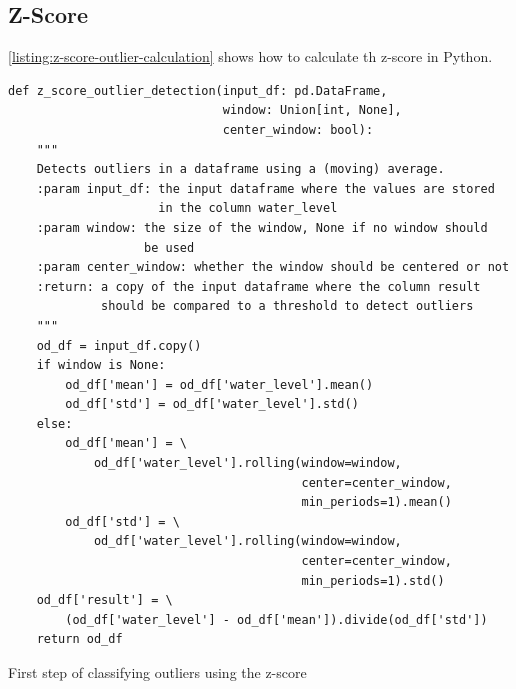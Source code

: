 \subsection{Z-Score}
\autoref{listing:z-score-outlier-calculation} shows how to calculate th z-score in Python.
\begin{listing}
\begin{verbatim}
def z_score_outlier_detection(input_df: pd.DataFrame,
                              window: Union[int, None],
                              center_window: bool):
    """
    Detects outliers in a dataframe using a (moving) average.
    :param input_df: the input dataframe where the values are stored
                     in the column water_level
    :param window: the size of the window, None if no window should
                   be used
    :param center_window: whether the window should be centered or not
    :return: a copy of the input dataframe where the column result
             should be compared to a threshold to detect outliers
    """
    od_df = input_df.copy()
    if window is None:
        od_df['mean'] = od_df['water_level'].mean()
        od_df['std'] = od_df['water_level'].std()
    else:
        od_df['mean'] = \
            od_df['water_level'].rolling(window=window,
                                         center=center_window,
                                         min_periods=1).mean()
        od_df['std'] = \
            od_df['water_level'].rolling(window=window,
                                         center=center_window,
                                         min_periods=1).std()
    od_df['result'] = \
        (od_df['water_level'] - od_df['mean']).divide(od_df['std'])
    return od_df
\end{verbatim}
\caption{First step of classifying outliers using the z-score}
\label{listing:z-score-outlier-calculation}
\end{listing}


